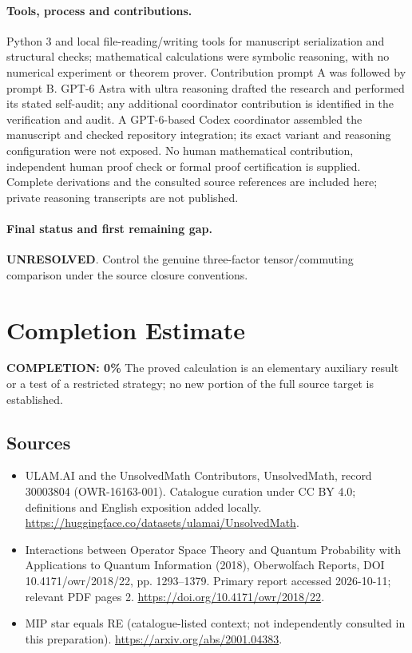 \documentclass[11pt]{article}
\begin{document}
\paragraph{Tools, process and contributions.}
Python 3 and local file-reading/writing tools for manuscript serialization and structural checks; mathematical calculations were symbolic reasoning, with no numerical experiment or theorem prover. Contribution prompt A was followed by prompt B. GPT-6 Astra with ultra reasoning drafted the research and performed its stated self-audit; any additional coordinator contribution is identified in the verification and audit. A GPT-6-based Codex coordinator assembled the manuscript and checked repository integration; its exact variant and reasoning configuration were not exposed. No human mathematical contribution, independent human proof check or formal proof certification is supplied. Complete derivations and the consulted source references are included here; private reasoning transcripts are not published.

\paragraph{Final status and first remaining gap.}
\textbf{UNRESOLVED}. Control the genuine three-factor tensor/commuting comparison under the source closure conventions.

\section{Completion Estimate}
\noindent\textbf{COMPLETION: 0\%}
The proved calculation is an elementary auxiliary result or a test of a restricted strategy; no new portion of the full source target is established.

\subsection{Sources}
\begin{itemize}
\item[\hypertarget{source:30003804:1}{S1}] ULAM.AI and the UnsolvedMath Contributors, UnsolvedMath, record 30003804 (OWR-16163-001). Catalogue curation under CC BY 4.0; definitions and English exposition added locally.
\url{https://huggingface.co/datasets/ulamai/UnsolvedMath}.
\item[\hypertarget{source:30003804:2}{S2}] Interactions between Operator Space Theory and Quantum Probability with Applications to Quantum Information (2018), Oberwolfach Reports, DOI 10.4171/owr/2018/22, pp. 1293--1379. Primary report accessed 2026-10-11; relevant PDF pages 2.
\url{https://doi.org/10.4171/owr/2018/22}.
\item[\hypertarget{source:30003804:3}{S3}] MIP star equals RE (catalogue-listed context; not independently consulted in this preparation).
\url{https://arxiv.org/abs/2001.04383}.
\end{itemize}
\label{end:30003804}
\end{document}
